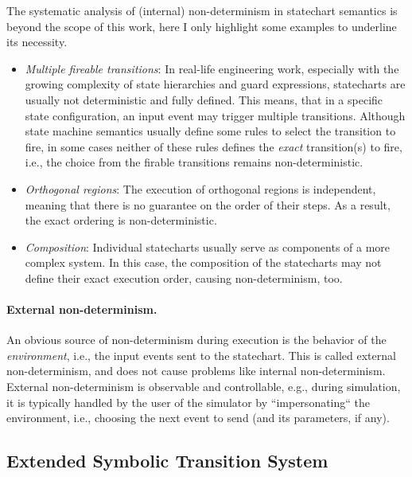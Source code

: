The systematic analysis of (internal) non-determinism in statechart semantics is beyond the scope of this work, here I only highlight some examples to underline its necessity.

\begin{itemize}
    \item \textit{Multiple fireable transitions}: In real-life engineering work, especially with the growing complexity of state hierarchies and guard expressions, statecharts are usually not deterministic and fully defined. This means, that in a specific state configuration, an input event may trigger multiple transitions. Although state machine semantics usually define some rules to select the transition to fire, in some cases neither of these rules defines the \textit{exact} transition(s) to fire, i.e., the choice from the firable transitions remains non-deterministic.
    \item \textit{Orthogonal regions}: The execution of orthogonal regions is independent, meaning that there is no guarantee on the order of their steps. As a result, the exact ordering is non-deterministic.
    \item \textit{Composition}: Individual statecharts usually serve as components of a more complex system. In this case, the composition of the statecharts may not define their exact execution order, causing non-determinism, too.
\end{itemize}

\paragraph{External non-determinism.} An obvious source of non-determinism during execution is the behavior of the \textit{environment}, i.e., the input events sent to the statechart. This is called external non-determinism, and does not cause problems like internal non-determinism. External non-determinism is observable and controllable, e.g., during simulation, it is typically handled by the user of the simulator by ``impersonating`` the environment, i.e., choosing the next event to send (and its parameters, if any).


\subsection{Extended Symbolic Transition System}\label{ssec:xsts}

